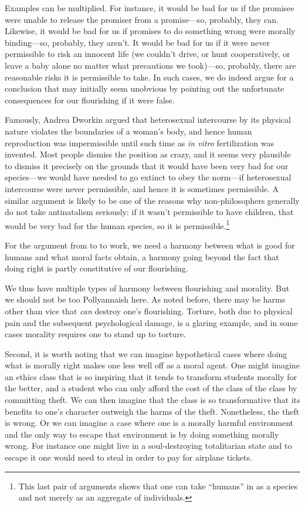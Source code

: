 Examples can be multiplied. For instance, it would be bad for us if the promisee were unable to release the
promiser from a promise---so, probably, they can. Likewise, it would be bad for us if promises to do something 
wrong were morally binding---so, probably, they aren't. It would be bad for us if it were never permissible 
to risk an innocent life (we couldn't drive, or hunt cooperatively, or leave a baby alone no matter what precautions
we took)---so, probably, there are reasonable risks it is permissible to take. In such cases, we do indeed argue
for a conclusion that may initially seem unobvious by pointing out the unfortunate consequences for our flourishing
if it were false. 

Famously, Andrea Dworkin argued that heterosexual intercourse by its physical nature violates the boundaries of
a woman's body, and hence human reproduction was impermissible until such time as \textit{in vitro} fertilization
was invented. Most people dismiss the position as crazy, and it seems very plausible to dismiss it precisely on the grounds
that it would have been very bad for our species---we would have needed to go extinct to obey the norm---if heterosexual intercourse were 
never permissible, and hence it is sometimes permissible. A similar argument is likely to be one of the
reasons why non-philosophers generally do not take antinatalism seriously: if it wasn't permissible to have children, that would be
very bad for the human species, so it is permissible.\footnote{This last pair of arguments shows that one can
take ``humans'' in  as a species and not merely as an aggregate of individuals.}

For the argument from  to  to work, we need a harmony between what is good for humans
and what moral facts obtain, a harmony going beyond the fact that doing right is partly constitutive of our flourishing.

We thus have multiple types of harmony between flourishing and morality.
But we should not be too Pollyannaish here. As noted before, there may 
be harms other than vice that \textit{can} destroy one's flourishing. Torture, both due to physical pain and the subsequent 
psychological damage, is a glaring example, and in some cases morality requires one to stand up to torture. 

Second, it is worth noting that we can imagine hypothetical cases where doing what is morally right makes one less 
well off as a moral agent. One might imagine an ethics class that is so inspiring that it tends to 
transform students morally for the better, and a student who can only afford the cost of the class of the class by 
committing theft. We can then imagine that the class is so transformative that its benefits to one's character outweigh
the harms of the theft. Nonetheless, the theft is wrong. Or we can imagine a case where one is a morally harmful 
environment and the only way to escape that environment is by doing something morally wrong. For instance one might 
live in a soul-destroying totalitarian state and to escape it one would need to steal in order to pay for airplane 
tickets.

